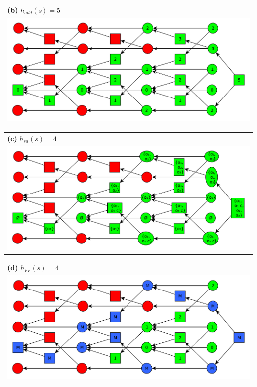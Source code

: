 \documentclass[11pt,a4paper]{article}
\begin{document}
\begin{tabular}{l} %
\textbf{(b)} $h_{add}(s)=5$\\
\includegraphics[scale=0.5]{g63b}\\
\end{tabular}

\begin{tabular}{l} %
\textbf{(c)} $h_{sa}(s)=4$\\
\includegraphics[scale=0.5]{g63c}\\
\end{tabular}

\begin{tabular}{l} %
\textbf{(d)} $h_{FF}(s)=4$\\
\includegraphics[scale=0.5]{g63d}\\
\end{tabular}
\end{document}
